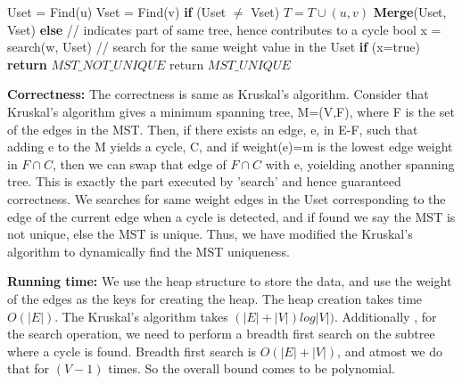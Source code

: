 \documentclass{article}
\newcommand\correctness{\vspace{.10in}\textbf{Correctness: }}
\newcommand\runtime{\vspace{.10in}\textbf{Running time: }}
\begin{document}
  \hspace*{1cm}		Uset = Find(u) \newline
  \hspace*{1cm}		Vset = Find(v) \newline
  \hspace*{1cm}		\textbf {if} (Uset $\neq$ Vset) \newline
  \hspace*{1.5cm}		$T = T \cup {(u,v)}$ \newline
  \hspace*{1.5cm}		\textbf {Merge}(Uset, Vset) \newline
  \hspace*{1cm}		\textbf {else} // indicates part of same tree, hence contributes to a cycle \newline
  \hspace*{1.5cm}		bool x = search(w, Uset) // search for the same weight value in the Uset \newline
  \hspace*{1.5cm}		\textbf {if} (x=true) \textbf {return} $MST\_NOT\_UNIQUE$ \newline
  \hspace*{0.5cm} return $MST\_UNIQUE$ \newline

  \correctness 
    The correctness is same as Kruskal's algorithm. Consider that Kruskal's algorithm gives a minimum spanning tree, M=(V,F), where F is the set of the edges in the MST. Then, if there exists an edge, e, in E-F, such that adding e to the M yields a cycle, C, and if weight(e)=m is the lowest edge weight in $F \cap C$, then we can swap that edge of $F \cap C$ with e, yoielding another spanning tree. This is exactly the part executed by 'search' and hence guaranteed correctness. We searches for same weight edges in the Uset corresponding to the edge of the current edge when a cycle is detected, and if found we say the MST is not unique, else the MST is unique. Thus, we have modified the Kruskal's algorithm to dynamically find the MST uniqueness. \newline

  \runtime
  We use the heap structure to store the data, and use the weight of the edges as the keys for creating the heap. The heap creation takes time $O(|E|)$. The Kruskal's algorithm takes $(|E|+|V|)log|V|)$. Additionally , for the search operation, we need to perform a breadth first search on the subtree where a cycle is found. Breadth first search is $O(|E|+|V|)$, and atmost we do that for $(V-1)$ times. So the overall bound comes to be polynomial. 
\end{document}
